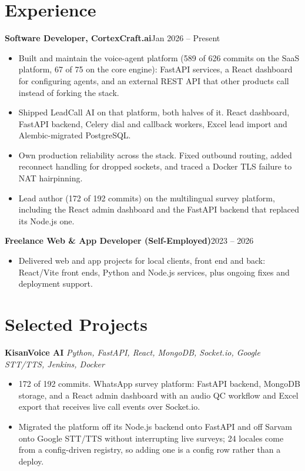 \documentclass[10pt,a4paper]{article}
\newcommand{\entry}[2]{\textbf{#1}\hfill{#2}\par}
\begin{document}
\section{Experience}
\entry{Software Developer, CortexCraft.ai}{Jan 2026 -- Present}
\begin{itemize}
  \item Built and maintain the voice-agent platform (589 of 626 commits on the SaaS platform, 67 of 75
        on the core engine): FastAPI services, a React dashboard for configuring agents, and an
        external REST API that other products call instead of forking the stack.
  \item Shipped LeadCall AI on that platform, both halves of it. React dashboard, FastAPI backend,
        Celery dial and callback workers, Excel lead import and Alembic-migrated PostgreSQL.
  \item Own production reliability across the stack. Fixed outbound routing, added reconnect handling
        for dropped sockets, and traced a Docker TLS failure to NAT hairpinning.
  \item Lead author (172 of 192 commits) on the multilingual survey platform, including the React
        admin dashboard and the FastAPI backend that replaced its Node.js one.
\end{itemize}

\vspace{1pt}
\entry{Freelance Web \& App Developer (Self-Employed)}{2023 -- 2026}
\begin{itemize}
  \item Delivered web and app projects for local clients, front end and back: React/Vite front ends,
        Python and Node.js services, plus ongoing fixes and deployment support.
\end{itemize}

\section{Selected Projects}
\textbf{KisanVoice AI} \textit{Python, FastAPI, React, MongoDB, Socket.io, Google STT/TTS, Jenkins, Docker}
\begin{itemize}
  \item 172 of 192 commits. WhatsApp survey platform: FastAPI backend, MongoDB storage, and a React
        admin dashboard with an audio QC workflow and Excel export that receives live call events
        over Socket.io.
  \item Migrated the platform off its Node.js backend onto FastAPI and off Sarvam onto Google STT/TTS
        without interrupting live surveys; 24 locales come from a config-driven registry, so adding
        one is a config row rather than a deploy.
\end{itemize}
\end{document}
